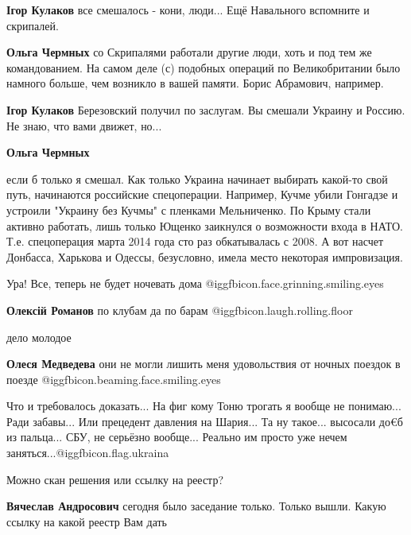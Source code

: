 \begin{itemize}
\begin{itemize}
\textbf{Ігор Кулаков} все смешалось - кони, люди... Ещё Навального вспомните и скрипалей.

\textbf{Ольга Чермных} со Скрипалями работали другие люди, хоть и под тем же командованием. На самом деле (с) подобных операций по Великобритании было намного больше, чем возникло в вашей памяти. Борис Абрамович, например.

\textbf{Ігор Кулаков} Березовский получил по заслугам. Вы смешали Украину и Россию. Не знаю, что вами движет, но...

\textbf{Ольга Чермных} 

если б только я смешал. Как только Украина начинает выбирать какой-то свой
путь, начинаются российские спецоперации. Например, Кучме убили Гонгадзе и
устроили "Украину без Кучмы" с пленками Мельниченко. По Крыму стали активно
работать, лишь только Ющенко заикнулся о возможности входа в НАТО. Т.е.
спецоперация марта 2014 года сто раз обкатывалась с 2008. А вот насчет
Донбасса, Харькова и Одессы, безусловно, имела место некоторая импровизация.

\end{itemize} %

Ура! Все, теперь не будет ночевать дома  @igg{fbicon.face.grinning.smiling.eyes} 

\begin{itemize} %
\textbf{Олексій Романов} по клубам да по барам  @igg{fbicon.laugh.rolling.floor} 

дело молодое

\textbf{Олеся Медведева} они не могли лишить меня удовольствия от ночных поездок в поезде  @igg{fbicon.beaming.face.smiling.eyes} 
\end{itemize} %


Что и требовалось доказать... На фиг кому Тоню трогать я вообще не понимаю...
Ради забавы... Или прецедент давления на Шария... Та ну такое... высосали до€б
из пальца... СБУ, не серьёзно вообще... Реально им просто уже нечем
заняться...@igg{fbicon.flag.ukraina}

Можно скан решения или ссылку на реестр?

\begin{itemize} %
\textbf{Вячеслав Андросович} сегодня было заседание только. Только вышли. Какую ссылку на какой реестр Вам дать


\end{itemize}
\end{itemize}
